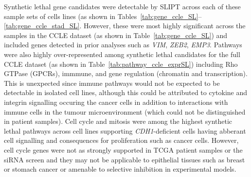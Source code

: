 Synthetic lethal gene candidates were detectable by \gls{SLIPT} across each of these sample sets of cells lines (as shown in Tables~\ref{tab:gene_ccle_SL}\nobreakdash--\ref{tab:gene_ccle_stad_SL}. However, these were most highly significant across the samples in the CCLE  dataset (as shown in Table~\ref{tab:gene_ccle_SL}) and included genes detected in prior analyses such as \textit{VIM}, \textit{ZEB2}, \textit{EMP3}. Pathways were also highly over-represented among \gls{synthetic lethal} candidates for the full CCLE dataset (as shown in Table~\ref{tab:pathway_ccle_exprSL}) including Rho GTPase (\glspl{GPCR}), immmune, and gene regulation (chromatin and transcription). This is unexpected since immune \glspl{pathway} would not be expected to be detectable in isolated cell lines, although this could be attributed to cytokine and integrin signalling occuring the cancer cells in addition to interactions with immune cells in the tumour microenvironment (which could not be distinguished in patient samples). Cell cycle and mitosis were among the highest \gls{synthetic lethal} \glspl{pathway} across cell lines supporting \textit{CDH1}-deficient cells having abberant cell signalling and consequences for proliferation such as cancer cells. However, cell cycle genes were not as strongly supported in \gls{TCGA} patient samples or the \gls{siRNA} screen \citep{Telford2015} and they may not be applicable to epithelial tissues such as breast or stomach cancer or amenable to selective inhibition in experimental models.   

